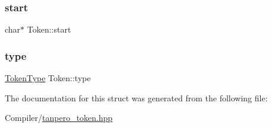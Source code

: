 \subsubsection{\texorpdfstring{start}{start}}
{\footnotesize\ttfamily char$\ast$ Token\+::start}

\mbox{\label{struct_token_a67919af9f3a80dc0b28a0ab1e6d5bf8a}} 
\subsubsection{\texorpdfstring{type}{type}}
{\footnotesize\ttfamily \mbox{\hyperlink{tanpero__token_8hpp_aa520fbf142ba1e7e659590c07da31921}{Token\+Type}} Token\+::type}



The documentation for this struct was generated from the following file\+:\begin{DoxyCompactItemize}
\item 
Compiler/\mbox{\hyperlink{tanpero__token_8hpp}{tanpero\+\_\+token.\+hpp}}\end{DoxyCompactItemize}
